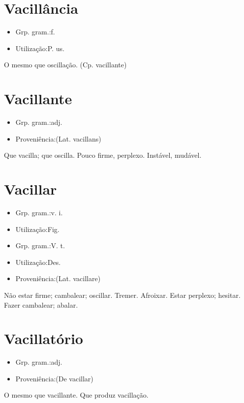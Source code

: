 \documentclass{article}
\begin{document}
\section{Vacillância}
\begin{itemize}
\item {Grp. gram.:f.}
\end{itemize}
\begin{itemize}
\item {Utilização:P. us.}
\end{itemize}
O mesmo que \textunderscore oscillação\textunderscore .
(Cp. \textunderscore vacillante\textunderscore )
\section{Vacillante}
\begin{itemize}
\item {Grp. gram.:adj.}
\end{itemize}
\begin{itemize}
\item {Proveniência:(Lat. \textunderscore vacillans\textunderscore )}
\end{itemize}
Que vacilla; que oscilla.
Pouco firme, perplexo.
Instável, mudável.
\section{Vacillar}
\begin{itemize}
\item {Grp. gram.:v. i.}
\end{itemize}
\begin{itemize}
\item {Utilização:Fig.}
\end{itemize}
\begin{itemize}
\item {Grp. gram.:V. t.}
\end{itemize}
\begin{itemize}
\item {Utilização:Des.}
\end{itemize}
\begin{itemize}
\item {Proveniência:(Lat. \textunderscore vacillare\textunderscore )}
\end{itemize}
Não estar firme; cambalear; oscillar.
Tremer.
Afroixar.
Estar perplexo; hesitar.
Fazer cambalear; abalar.
\section{Vacillatório}
\begin{itemize}
\item {Grp. gram.:adj.}
\end{itemize}
\begin{itemize}
\item {Proveniência:(De \textunderscore vacillar\textunderscore )}
\end{itemize}
O mesmo que \textunderscore vacillante\textunderscore .
Que produz vacillação.
\end{document}
